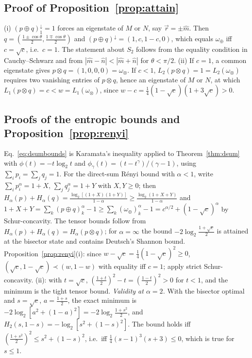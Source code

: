 \documentclass[11pt]{article}
\theoremstyle{definition}
\newcommand{\vecr}{\vec r}
\newcommand{\mhat}{\hat m}
\newcommand{\nhat}{\hat n}
\newcommand{\maj}{\prec}
\newcommand{\omplus}{\omega_{\oplus}}
\newcommand{\omtimes}{\omega_{\otimes}}
\newcommand{\sqc}{\sqrt{c}}
\begin{document}
\subsection*{Proof of Proposition~\ref{prop:attain}}

(i) $(p\oplus q)^\downarrow_1=1$ forces an eigenstate of $M$ or $N$, say $\vecr=\pm\mhat$.
Then $q=(\frac{1\pm\cos\theta}2,\frac{1\mp\cos\theta}2)$ and $(p\oplus q)^\downarrow=(1,c,1-c,0)$,
which equals $\omplus$ iff $c=\sqc$, i.e.\ $c=1$. The statement about $S_2$ follows
from the equality condition in Cauchy--Schwarz and from $|\mhat-\nhat|<|\mhat+\nhat|$
for $\theta<\pi/2$. (ii) If $c=1$, a common eigenstate gives $p\otimes q=(1,0,0,0)=\omtimes$.
If $c<1$, $L_2(p\otimes q)=1=L_2(\omtimes)$ requires two vanishing entries of $p\otimes q$,
hence an eigenstate of $M$ or $N$, at which $L_1(p\otimes q)=c<w=L_1(\omtimes)$, since
$w-c=\frac14(1-\sqc)(1+3\sqc)>0$.

\subsection*{Proofs of the entropic bounds and Proposition~\ref{prop:renyi}}

Eq.~\eqref{eq:dsumbounds} is Karamata's inequality applied to Theorem~\ref{thm:dsum}
with $\phi(t)=-t\log_2t$ and $\phi_\gamma(t)=(t-t^\gamma)/(\gamma-1)$, using
$\sum_ip_i=\sum_jq_j=1$. For the direct-sum R\'enyi bound with $\alpha<1$, write
$\sum_ip_i^\alpha=1+X$, $\sum_jq_j^\alpha=1+Y$ with $X,Y\ge0$; then
$H_\alpha(p)+H_\alpha(q)=\frac{\log_2[(1+X)(1+Y)]}{1-\alpha}\ge\frac{\log_2(1+X+Y)}{1-\alpha}$ and
$1+X+Y=\sum_k(p\oplus q)_k^\alpha-1\ge\sum_k(\omplus)_k^\alpha-1=c^{\alpha/2}+(1-\sqc)^\alpha$ by
Schur-concavity\cite{RPZ2014}. The tensor bounds follow from
$H_\alpha(p)+H_\alpha(q)=H_\alpha(p\otimes q)$\cite{FGG2013,PRZ2013}; for $\alpha=\infty$ the bound
$-2\log_2\frac{1+\sqc}2$ is attained at the bisector state and contains Deutsch's
Shannon bound\cite{Deutsch1983}. Proposition~\ref{prop:renyi}(i): since
$w-\sqc=\frac14(1-\sqc)^2\ge0$, $(\sqc,1-\sqc)\maj(w,1-w)$ with equality iff $c=1$; apply
strict Schur-concavity. (ii): with $t=\sqc$, $(\frac{1+t}2)^2-t=(\frac{1-t}2)^2>0$
for $t<1$, and the minimum is the tight tensor bound.
\emph{Validity at $\alpha=2$.} With the bisector optimal\cite{ZozorBosykPortesi2013} and
$s=\sqc$, $a=\frac{1+s}2$, the exact minimum is $-2\log_2[a^2+(1-a)^2]=-2\log_2\frac{1+s^2}2$,
and $H_2(s,1-s)=-\log_2[s^2+(1-s)^2]$. The bound holds iff
$(\frac{1+s^2}2)^2\le s^2+(1-s)^2$, i.e.\ iff $\frac14(s-1)^3(s+3)\le0$, which is true for $s\le1$.
\end{document}
